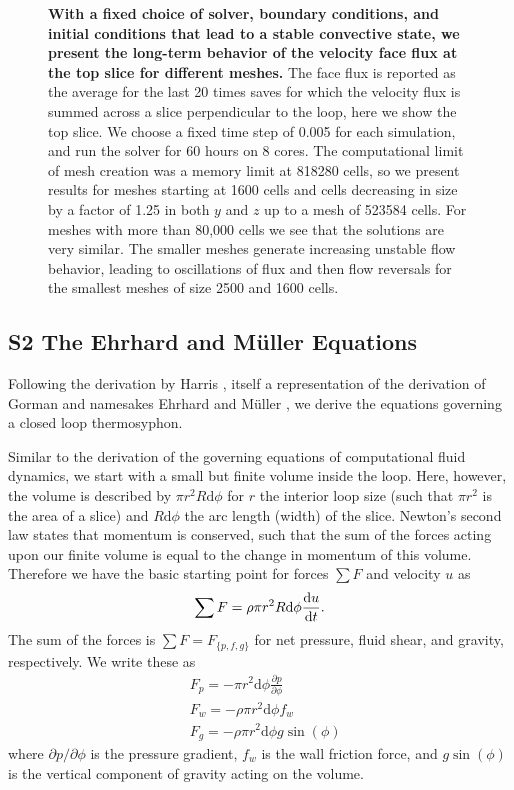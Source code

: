 \documentclass[10pt,letterpaper]{article}
\newcommand{\pdiff}[2]{\frac{\partial #1}{\partial #2}}
\newcommand{\diff}[2]{\frac{{\rm d}#1}{{\rm d}#2}}
\begin{document}
\begin{figure}[h!]
  \centering
  \caption[Long-term behavior for different meshes]{
  \textbf{With a fixed choice of solver, boundary conditions, and initial conditions that lead to a stable convective state, we present the long-term behavior of the velocity face flux at the top slice for different meshes.}
    The face flux is reported as the average for the last 20 times saves for which the velocity flux is summed across a slice perpendicular to the loop, here we show the top slice.
    We choose a fixed time step of 0.005 for each simulation, and run the solver for 60 hours on 8 cores.
    The computational limit of mesh creation was a memory limit at 818280 cells, so we present results for meshes starting at 1600 cells and cells decreasing in size by a factor of 1.25 in both $y$ and $z$ up to a mesh of 523584 cells.
    For meshes with more than 80,000 cells we see that the solutions are very similar.
    The smaller meshes generate increasing unstable flow behavior, leading to oscillations of flux and then flow reversals for the smallest meshes of size 2500 and 1600 cells.
  }
  \label{fig:meshverification}
\end{figure}

\clearpage
\pagebreak
\subsection*{S2 The Ehrhard and M\"{u}ller Equations}
\label{S2}

Following the derivation by Harris \cite{harris2011predicting}, itself a representation of the derivation of Gorman \cite{gorman1986} and namesakes Ehrhard and M\"{u}ller \cite{ehrhard1990dynamical}, we derive the equations governing a closed loop thermosyphon.

Similar to the derivation of the governing equations of computational fluid dynamics, we start with a small but finite volume inside the loop.
Here, however, the volume is described by $\pi r^2 R \text{d} \phi$ for $r$ the interior loop size (such that $\pi r^2$ is the area of a slice) and $R\text{d}\phi$ the arc length (width) of the slice.
Newton's second law states that momentum is conserved, such that the sum of the forces acting upon our finite volume is equal to the change in momentum of this volume.
Therefore we have the basic starting point for forces $\sum F$ and velocity $u$ as
\begin{equation} \sum F = \rho \pi r^2 R \text{d}\phi \diff{u}{t} .\end{equation}
The sum of the forces is $\sum F = F_{\{p,f,g\}}$ for net pressure, fluid shear, and gravity, respectively.
We write these as
\begin{align} & F_p = -\pi r^2 \text{d} \phi \pdiff{p}{\phi}\\
& F_w = -\rho \pi r^2 \text{d} \phi f_w\\
& F_g = -\rho \pi r^2 \text{d} \phi g \sin (\phi)\end{align}
where $\partial p /\partial \phi$ is the pressure gradient, $f_w$ is the wall friction force, and $g \sin (\phi)$ is the vertical component of gravity acting on the volume.
\end{document}
